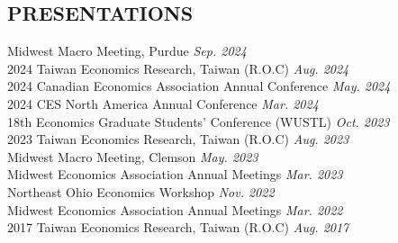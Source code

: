 \documentclass[12pt]{res} %
\begin{document}
\begin{resume}

\section{PRESENTATIONS}%
\label{sub:conference_paper}
\vspace{8pt} %
Midwest Macro Meeting, Purdue \hfill \textit{Sep. 2024} \\
2024 Taiwan Economics Research, Taiwan (R.O.C) \hfill  \textit{Aug. 2024} \\
2024 Canadian Economics Association Annual Conference \hfill \textit{May. 2024} \\
2024 CES North America Annual Conference \hfill \textit{Mar. 2024} \\
18th Economics Graduate Students' Conference (WUSTL) \hfill \textit{Oct. 2023} \\
2023 Taiwan Economics Research, Taiwan (R.O.C) \hfill  \textit{Aug. 2023} \\
Midwest Macro Meeting, Clemson \hfill \textit{May. 2023} \\
Midwest Economics Association Annual Meetings \hfill \textit{Mar. 2023} \\
Northeast Ohio Economics Workshop \hfill \textit{Nov. 2022} \\
Midwest Economics Association Annual Meetings \hfill \textit{Mar. 2022} \\
2017 Taiwan Economics Research, Taiwan (R.O.C) \hfill  \textit{Aug. 2017}



\end{resume}
\end{document}

